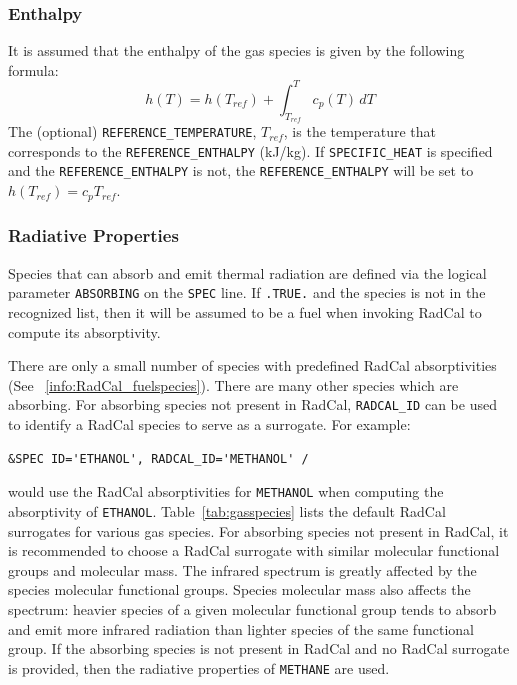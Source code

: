 \documentclass[11pt]{book}
\newcommand{\ct}{\tt\small}
\newcommand{\be}{\begin{equation}}
\newcommand{\ee}{\end{equation}}
\begin{document}
\subsubsection{Enthalpy}

It is assumed that the enthalpy of the gas species is given by the following formula:
\be
   h(T) = h(T_{ref}) + \int_{T_{ref}}^T c_p(T) \, dT
\ee
The (optional) {\ct REFERENCE\_TEMPERATURE}, $T_{ref}$, is the temperature that corresponds to
the {\ct REFERENCE\_ENTHALPY} (kJ/kg).  If {\ct SPECIFIC\_HEAT} is specified and the {\ct REFERENCE\_ENTHALPY} is not, the {\ct REFERENCE\_ENTHALPY} will be set to $h(T_{ref})=c_p T_{ref}$.


\subsubsection{Radiative Properties}

Species that can absorb and emit thermal radiation are defined via the logical parameter {\ct ABSORBING} on the {\ct SPEC} line.  If {\ct .TRUE.} and the
species is not in the recognized list, then it will be assumed to be a fuel when invoking RadCal to compute its absorptivity.

There are only a small number of species with predefined RadCal absorptivities (See ~\ref{info:RadCal_fuelspecies}).  There are many other species which are absorbing.  For absorbing species not present in RadCal, {\ct RADCAL\_ID} can be used to identify a RadCal species to serve as a surrogate. For example:

\footnotesize
\begin{verbatim}
&SPEC ID='ETHANOL', RADCAL_ID='METHANOL' /
\end{verbatim} \normalsize

\noindent would use the RadCal absorptivities for {\ct METHANOL} when computing the absorptivity of {\ct ETHANOL}. Table~\ref{tab:gasspecies} lists the default RadCal surrogates for various gas species. 
For absorbing species not present in RadCal, it is recommended to choose a RadCal surrogate with similar molecular functional groups and molecular mass. The infrared spectrum is greatly affected by the species molecular functional groups.
 Species molecular mass also affects the spectrum: heavier species of a given molecular functional group tends to absorb and emit more infrared radiation than lighter species of the same functional group.
If the absorbing species is not present in RadCal and no RadCal surrogate is provided, then the radiative properties of {\ct METHANE} are used.
\end{document}
